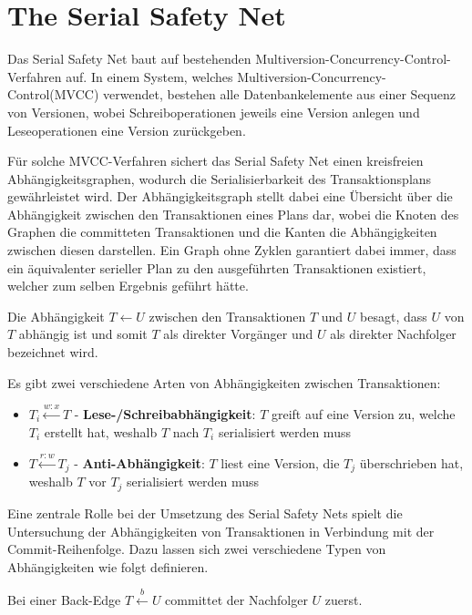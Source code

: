 \section{The Serial Safety Net}
Das Serial Safety Net baut auf bestehenden Multiversion-Concurrency-Control-Verfahren auf.
In einem System, welches Multiversion-Concurrency-Control(MVCC) verwendet, bestehen alle Datenbankelemente aus einer Sequenz von Versionen, wobei Schreiboperationen jeweils eine Version anlegen und Leseoperationen eine Version zurückgeben.

Für solche MVCC-Verfahren sichert das Serial Safety Net einen kreisfreien Abhängigkeitsgraphen, wodurch die Serialisierbarkeit des Transaktionsplans gewährleistet wird.
Der Abhängigkeitsgraph stellt dabei eine Übersicht über die Abhängigkeit zwischen den Transaktionen eines Plans dar, wobei die Knoten des Graphen die committeten Transaktionen und die Kanten die Abhängigkeiten zwischen diesen darstellen.
Ein Graph ohne Zyklen garantiert dabei immer, dass ein äquivalenter serieller Plan zu den ausgeführten Transaktionen existiert, welcher zum selben Ergebnis geführt hätte.

\begin{Definition}
	Die Abhängigkeit $T\leftarrow U$ zwischen den Transaktionen $T$ und $U$ besagt, dass $U$ von $T$ abhängig ist und somit $T$ als direkter Vorgänger und $U$ als direkter Nachfolger bezeichnet wird.
\end{Definition}

Es gibt zwei verschiedene Arten von Abhängigkeiten zwischen Transaktionen:
\begin{itemize}
	\item $T_i\xleftarrow{w:x}T$ - \textbf{Lese-/Schreibabhängigkeit}: $T$ greift auf eine Version zu, welche $T_i$ erstellt hat, weshalb $T$ nach $T_i$ serialisiert werden muss
	\item $T\xleftarrow{r:w}T_j$ - \textbf{Anti-Abhängigkeit}: $T$ liest eine Version, die $T_j$ überschrieben hat, weshalb $T$ vor $T_j$ serialisiert werden muss
\end{itemize}

Eine zentrale Rolle bei der Umsetzung des Serial Safety Nets spielt die Untersuchung der Abhängigkeiten von Transaktionen in Verbindung mit der Commit-Reihenfolge.
Dazu lassen sich zwei verschiedene Typen von Abhängigkeiten wie folgt definieren.

\begin{Definition}
	Bei einer \textcolor{my-green}{Back-Edge} $T\xleftarrow{b} U$ committet der Nachfolger $U$ zuerst.
\end{Definition}

